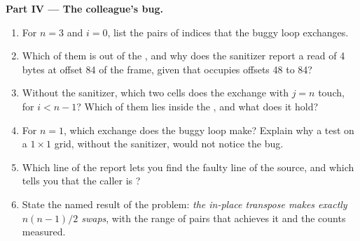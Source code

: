 \begin{problem}
\medskip\noindent\textbf{Part IV --- The colleague's bug.}
\begin{enumerate}[resume]
\item For $n = 3$ and $i = 0$, list the pairs of indices that the buggy loop exchanges.
\item Which of them is out of the , and why does the sanitizer report a read of 4 bytes at offset 84 of the
frame, given that  occupies offsets 48 to 84?
\item Without the sanitizer, which two cells does the exchange with $j = n$ touch, for $i < n - 1$? Which of them lies inside the , and what does it hold?
\item For $n = 1$, which exchange does the buggy loop make? Explain why a test on a $1 \times 1$ grid, without the sanitizer, would not notice the bug.
\item Which line of the report lets you find the faulty line of the source, and which tells you that the caller is
?
\item State the named result of the problem: \emph{the in-place transpose makes exactly $n(n-1)/2$ swaps}, with the
range of pairs that achieves it and the counts measured.
\end{enumerate}
\end{problem}
